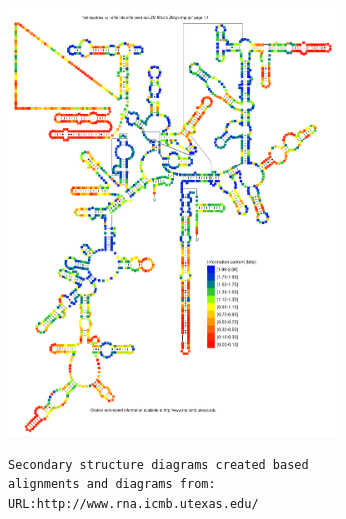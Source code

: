 \documentclass[landscape]{slides}
\begin{document}
\begin{slide}
\begin{center}
\includegraphics[height=4.45in]{figs/euk_info_heat}
\end{center}

\begin{flushright}
\tiny{\texttt{Secondary structure diagrams created based}} \\
\tiny{\texttt{alignments and diagrams from:}} \\
\tiny{\texttt{URL:http://www.rna.icmb.utexas.edu/}}
\end{flushright}
\vfill
\end{slide}

% 
\end{document}

